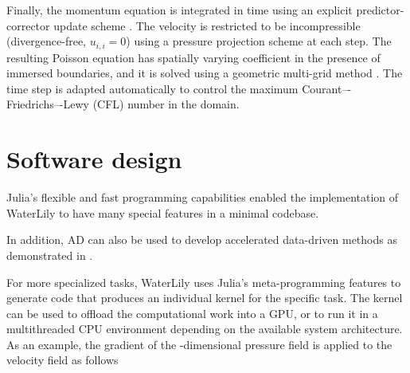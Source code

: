 \documentclass[10pt,a4paper]{article}
\begin{document}
Finally, the momentum equation is integrated in time using an explicit predictor-corrector update scheme \citep{Lauber2022}. The velocity is restricted to be incompressible (divergence-free, $u_{i,i}=0$) using a pressure projection scheme at each step. The resulting Poisson equation has spatially varying coefficient in the presence of immersed boundaries, and it is solved using a geometric multi-grid method \citep{Weymouth2022}. The time step is adapted automatically to control the maximum Courant–-Friedrichs–-Lewy (CFL) number in the domain.

\section{Software design}\label{sec:software_design}

Julia’s flexible and fast programming capabilities enabled the implementation of WaterLily to have many special features in a minimal codebase. 

 In addition, AD can also be used to develop accelerated data-driven methods as demonstrated in \cite{Weymouth2022}.

For more specialized tasks, WaterLily uses Julia's meta-programming features to generate code that produces an individual kernel for the specific task. The kernel can be used to offload the computational work into a GPU, or to run it in a multithreaded CPU environment depending on the available system architecture. As an example, the gradient of the -dimensional pressure field  is applied to the velocity field  as follows
\end{document}

